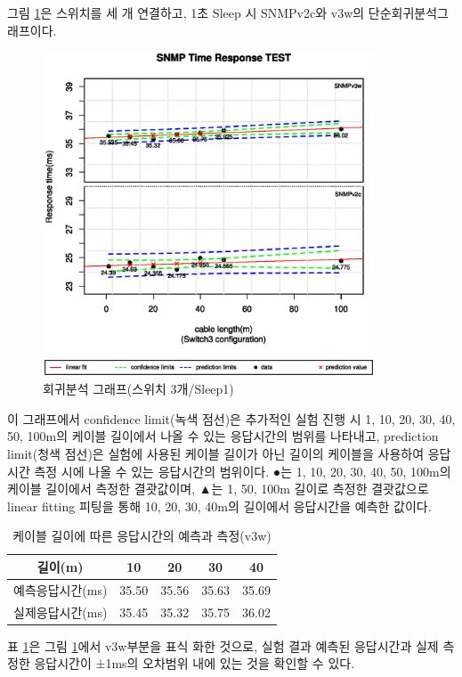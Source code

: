 \documentclass[11pt
  , a4paper
  , article
  , oneside
]{memoir}
\begin{document}
그림 \ref{fig:s3s1}은 스위치를 세 개 연결하고, 1초 Sleep 시 SNMPv2c와 v3w의 단순회귀분석그래프이다.  

\begin{figure}[!htb]
  \centering
  \includegraphics[width=0.88\textwidth]{./images/s3s1.eps}
  \caption{회귀분석 그래프(스위치 3개/Sleep1)}
  \label{fig:s3s1}   
\end{figure}

이 그래프에서 confidence limit(녹색 점선)은 추가적인 실험 진행 시 1, 10, 20, 30, 40, 50, 100m의 케이블 길이에서 나올 수 있는 응답시간의 범위를 나타내고, prediction limit(청색 점선)은 실험에 사용된 케이블 길이가 아닌 길이의 케이블을 사용하여 응답시간 측정 시에 나올 수 있는 응답시간의 범위이다. ●는 1, 10, 20, 30, 40, 50, 100m의 케이블 길이에서 측정한 결괏값이며, ▲는 1, 50, 100m 길이로 측정한 결괏값으로 linear fitting 피팅을 통해 10, 20, 30, 40m의 길이에서 응답시간을 예측한 값이다. 

\begin{table}[!htb]
\begin{center}
\begin{tabular}{c|c|c|c|c}\hline
길이(m) & 10 & 20 & 30 & 40 \\ \hline
예측응답시간(ms)& 35.50 & 35.56 & 35.63 & 35.69 \\ \hline
실제응답시간(ms)& 35.45 & 35.32 & 35.75 & 36.02 \\ \hline
\end{tabular}
\caption{케이블 길이에 따른 응답시간의 예측과 측정(v3w)}
  \label{table:predict_time}  
\end{center}
\end{table} 
표 \ref{table:predict_time}은 그림 \ref{fig:s3s1}에서 v3w부분을 표식 화한 것으로, 실험 결과 예측된 응답시간과 실제 측정한 응답시간이 ±1ms의 오차범위 내에 있는 것을 확인할 수 있다.
\end{document}

